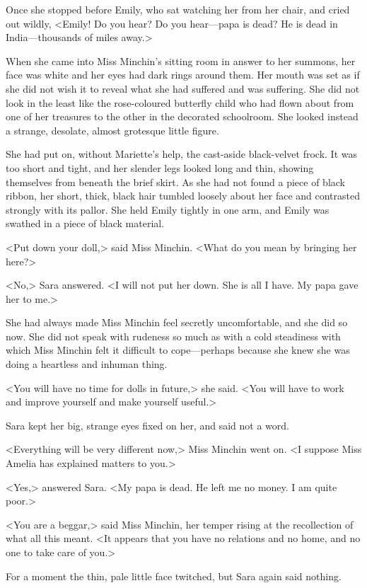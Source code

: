Once she stopped before Emily, who sat watching her from her chair, and cried out wildly, <Emily! Do you hear? Do you hear—papa is dead? He is dead in India—thousands of miles away.>

When she came into Miss Minchin's sitting room in answer to her summons, her face was white and her eyes had dark rings around them. Her mouth was set as if she did not wish it to reveal what she had suffered and was suffering. She did not look in the least like the rose-coloured butterfly child who had flown about from one of her treasures to the other in the decorated schoolroom. She looked instead a strange, desolate, almost grotesque little figure.

She had put on, without Mariette's help, the cast-aside black-velvet frock. It was too short and tight, and her slender legs looked long and thin, showing themselves from beneath the brief skirt. As she had not found a piece of black ribbon, her short, thick, black hair tumbled loosely about her face and contrasted strongly with its pallor. She held Emily tightly in one arm, and Emily was swathed in a piece of black material.

<Put down your doll,> said Miss Minchin. <What do you mean by bringing her here?>

<No,> Sara answered. <I will not put her down. She is all I have. My papa gave her to me.>

She had always made Miss Minchin feel secretly uncomfortable, and she did so now. She did not speak with rudeness so much as with a cold steadiness with which Miss Minchin felt it difficult to cope—perhaps because she knew she was doing a heartless and inhuman thing.

<You will have no time for dolls in future,> she said. <You will have to work and improve yourself and make yourself useful.>

Sara kept her big, strange eyes fixed on her, and said not a word.

<Everything will be very different now,> Miss Minchin went on. <I suppose Miss Amelia has explained matters to you.>

<Yes,> answered Sara. <My papa is dead. He left me no money. I am quite poor.>

<You are a beggar,> said Miss Minchin, her temper rising at the recollection of what all this meant. <It appears that you have no relations and no home, and no one to take care of you.>

For a moment the thin, pale little face twitched, but Sara again said nothing.

